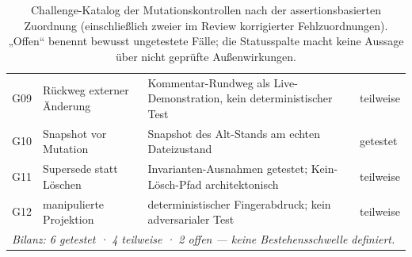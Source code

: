 \begin{table}[htbp]
\begin{tabular}{l>{\raggedright\arraybackslash}p{}>{\raggedright\arraybackslash}p{}l}
    G09 & Rückweg externer Änderung & Kommentar-Rundweg als Live-Demonstration, kein deterministischer Test & teilweise \\
    G10 & Snapshot vor Mutation & Snapshot des Alt-Stands am echten Dateizustand & getestet \\
    G11 & Supersede statt Löschen & Invarianten-Ausnahmen getestet; Kein-Lösch-Pfad architektonisch & teilweise \\
    G12 & manipulierte Projektion & deterministischer Fingerabdruck; kein adversarialer Test & teilweise \\
    \hline
    \multicolumn{4}{l}{\emph{Bilanz: 6 getestet · 4 teilweise · 2 offen — keine Bestehensschwelle definiert.}} \\
    \hline
  \end{tabular}
  \caption[Challenge-Katalog der Mutationskontrollen]{Challenge-Katalog der Mutationskontrollen nach der
    assertionsbasierten Zuordnung (einschließlich zweier im Review
    korrigierter Fehlzuordnungen). „Offen`` benennt bewusst
    ungetestete Fälle; die Statusspalte macht keine Aussage über
    nicht geprüfte Außenwirkungen.}
  \label{t:eval-challenge}
\end{table}
